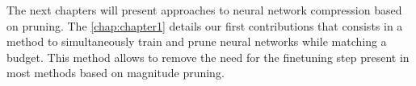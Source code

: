 The next chapters will present approaches to neural network compression based on
pruning. The \cref{chap:chapter1} details our first contributions that consists
in a method to simultaneously train and prune neural networks while matching a
budget. This method allows to remove the need for the finetuning step present in
most methods based on magnitude pruning.




